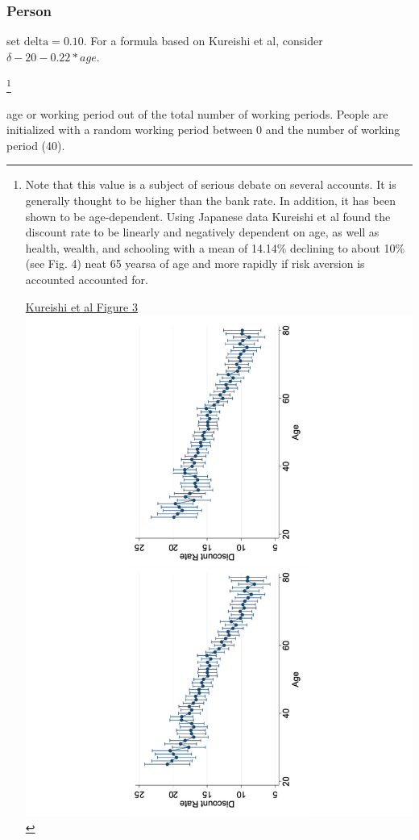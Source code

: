 \subsubsection{Person}
\begin{description}
{\color{red}
\item[subjective discount rate] set $\mathrm{delta} = 0.10$.  For a formula based on Kureishi et al, consider $\delta- 20-0.22*age$.}
\footnote{Note that this value is a subject of serious debate on several accounts. It is generally thought to be higher than the bank rate. In addition, it has been shown to be age-dependent. Using Japanese data Kureishi et al \cite{kureishiTimePreferencesLife2021} found the discount rate to be linearly and negatively dependent on age, as well as health, wealth, and schooling with a mean of 14.14\%  declining %
to about 10\% (see Fig. 4) neat 65 yearsa of age and more rapidly if risk aversion is accounted accounted for. 

 \underline{Kureishi et al Figure 3} \includegraphics[scale=.35, angle=-90, trim= 5cm  0cm 5cm 0cm,clip]{fig/age_dependent_discount_rates.pdf}
}



\item[working period] age or working period out of the total number of working periods. People are initialized with a random working period between 0 and the number of working period (40).
\end{description}

